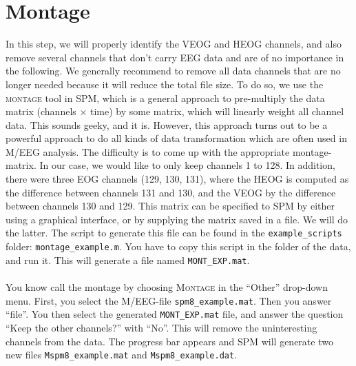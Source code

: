 \section{Montage}
In this step, we will properly identify the VEOG and HEOG channels, and also remove several channels that don't carry EEG data and are of no importance in the following. We generally recommend to remove all data channels that are no longer needed because it will reduce the total file size. To do so, we use the \textsc{montage} tool in SPM, which is a general approach to pre-multiply the data matrix (channels $\times$ time) by some matrix, which will linearly weight all channel data. This sounds geeky, and it is. However, this approach turns out to be a powerful approach to do all kinds of data transformation which are often used in M/EEG analysis. The difficulty is to come up with the appropriate montage-matrix. In our case, we would like to only keep channels 1 to 128. In addition, there were three EOG channels (129, 130, 131), where the HEOG is computed as the difference between channels 131 and 130, and the VEOG by the difference between channels 130 and 129. This matrix can be specified to SPM by either using a graphical interface, or by supplying the matrix saved in a file. We will do the latter. The script to generate this file can be found in the \texttt{example\_scripts} folder: \texttt{montage\_example.m}. You have to copy this script in the folder of the data, and run it. This will generate a file named \texttt{MONT\_EXP.mat}.
\\
\\
You know call the montage by choosing \textsc{Montage} in the ``Other'' drop-down menu. First, you select the M/EEG-file \texttt{spm8\_example.mat}. Then you answer ``file''. You then select the generated \texttt{MONT\_EXP.mat} file, and answer the question ``Keep the other channels?'' with ``No''. This will remove the uninteresting channels from the data. The progress bar appears and SPM will generate two new files \texttt{Mspm8\_example.mat} and \texttt{Mspm8\_example.dat}.

